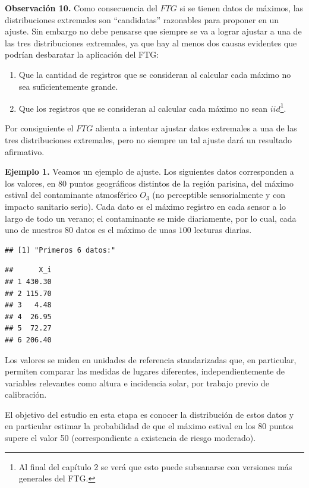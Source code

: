 \documentclass[
]{book}
\theoremstyle{definition}
\theoremstyle{definition}
\theoremstyle{definition}
\theoremstyle{definition}
\theoremstyle{remark}
\begin{document}
\textbf{Observación 10.} Como consecuencia del \(FTG\) si se tienen datos de máximos, las distribuciones extremales son ``candidatas'' razonables para proponer en un ajuste.
Sin embargo no debe pensarse que siempre se va a lograr ajustar a una de las tres distribuciones extremales, ya que hay al menos dos causas evidentes que podrían desbaratar la aplicación del FTG:

\begin{enumerate}
\def\labelenumi{\arabic{enumi})}
\item
  Que la cantidad de registros que se consideran al
  calcular cada máximo no sea suficientemente
  grande.
\item
  Que los registros que se consideran al calcular cada máximo no sean \(iid\)\footnote{Al final del capítulo 2 se verá que esto puede subsanarse con versiones más generales del FTG.}.
\end{enumerate}

Por consiguiente el \(FTG\) alienta a intentar ajustar datos
extremales a una de las tres distribuciones extremales, pero no
siempre un tal ajuste dará un resultado afirmativo.

\textbf{Ejemplo 1.} Veamos un ejemplo de ajuste. Los
siguientes datos corresponden a los valores, en \(80\) puntos geográficos distintos de la región parisina, del máximo estival del contaminante atmosférico \(O_3\) (no perceptible sensorialmente y con impacto
sanitario serio). Cada dato es el máximo registro en cada sensor a lo largo de todo un verano; el contaminante se mide diariamente, por lo cual, cada uno de nuestros \(80\) datos es el máximo de unas \(100\) lecturas diarias.

\begin{verbatim}
## [1] "Primeros 6 datos:"
\end{verbatim}

\begin{verbatim}
##      X_i
## 1 430.30
## 2 115.70
## 3   4.48
## 4  26.95
## 5  72.27
## 6 206.40
\end{verbatim}

Los valores se miden en unidades de referencia
standarizadas que, en particular, permiten
comparar las medidas de lugares diferentes,
independientemente de variables relevantes como
altura e incidencia solar, por trabajo previo de
calibración.

El objetivo del estudio en esta etapa es conocer la
distribución de estos datos y en particular estimar
la probabilidad de que el máximo estival en los 80
puntos supere el valor 50 (correspondiente a
existencia de riesgo moderado).
\end{document}
